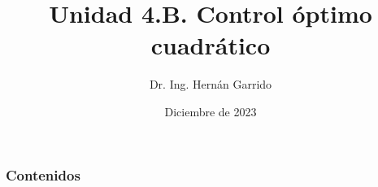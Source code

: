 \documentclass{beamer}
\title[LQR]{Unidad 4.B. Control óptimo cuadrático} %
\author{Dr. Ing. Hernán Garrido} %
\institute[FING-UNCUYO] %
{
Control y sistemas \\
Universidad Nacional de Cuyo, Facultad de Ingeniería \\ %
\medskip
\textit{carloshernangarrido@gmail.com} %
}
\date{Diciembre de 2023} %
\begin{document}
\begin{frame}
\titlepage %
\end{frame}

\begin{frame}
\frametitle{Contenidos} %
\tableofcontents %
\end{frame}


\end{document}
